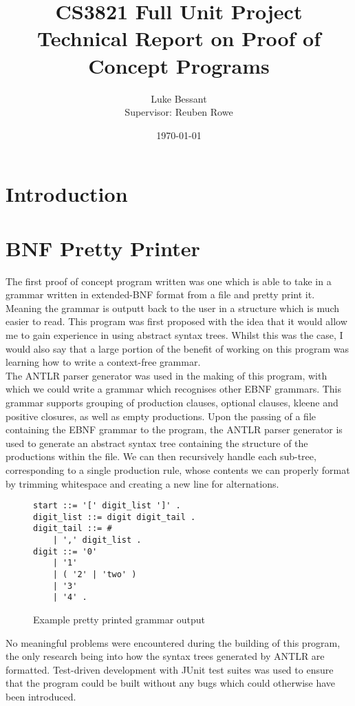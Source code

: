 \documentclass[a4paper, 11pt]{article}
\title{\textbf{CS3821 Full Unit Project}\\Technical Report on Proof of Concept Programs}
\author{Luke Bessant\\Supervisor: Reuben Rowe}
\date{\today}
\begin{document}
\maketitle
\thispagestyle{title}
\newpage

\tableofcontents
\clearpage
\newpage

\section{Introduction}

\clearpage
\section{BNF Pretty Printer}
The first proof of concept program written was one which is able to take in a grammar written in extended-BNF format from a file and pretty print it. Meaning the grammar is outputt back to the user in a structure which is much easier to read. This program was first proposed with the idea that it would allow me to gain experience in using abstract syntax trees. Whilst this was the case, I would also say that a large portion of the benefit of working on this program was learning how to write a context-free grammar.
\\\newline
The ANTLR parser generator was used in the making of this program, with which we could write a grammar which recognises other EBNF grammars. This grammar supports grouping of production clauses, optional clauses, kleene and positive closures, as well as empty productions. Upon the passing of a file containing the EBNF grammar to the program, the ANTLR parser generator is used to generate an abstract syntax tree containing the structure of the productions within the file. We can then recursively handle each sub-tree, corresponding to a single production rule, whose contents we can properly format by trimming whitespace and creating a new line for alternations.

\begin{figure}[H]
\centering
\begin{BVerbatim}
start ::= '[' digit_list ']' .
digit_list ::= digit digit_tail . 
digit_tail ::= # 
	| ',' digit_list . 
digit ::= '0' 
	| '1' 
	| ( '2' | 'two' ) 
	| '3' 
	| '4' .
\end{BVerbatim}
\caption{Example pretty printed grammar output}
\end{figure}

\noindent No meaningful problems were encountered during the building of this program, the only research being into how the syntax trees generated by ANTLR are formatted. Test-driven development with JUnit test suites was used to ensure that the program could be built without any bugs which could otherwise have been introduced.
\end{document}
